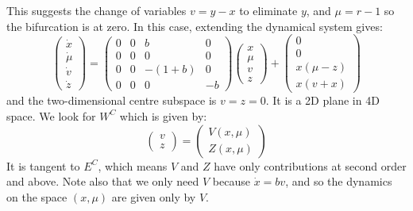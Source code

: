 \documentclass[../Main.tex]{subfiles}
\begin{document}
\begin{example}
    This suggests the change of variables $v = y-x$ to eliminate $y$, and $\mu = r - 1$ so the bifurcation is at zero. In this case, extending the dynamical system gives:
    \begin{equation*}
        \begin{pmatrix}\dot x \\ \dot \mu \\ \dot v \\ \dot z\end{pmatrix} =
        \begin{pmatrix}
            0 & 0 & b & 0 \\
            0 & 0 & 0 & 0 \\
            0 & 0 & -(1+b) & 0 \\
            0 & 0 & 0 & -b
        \end{pmatrix}
        \begin{pmatrix}x \\ \mu \\ v \\ z\end{pmatrix} + 
        \begin{pmatrix}0 \\ 0 \\ x(\mu - z) \\ x(v+x)\end{pmatrix}
    \end{equation*}
    and the two-dimensional centre subspace is $v = z = 0$. It is a 2D plane in 4D space. We look for $W^C$ which is given by:
    \begin{equation*}
        \begin{pmatrix}v \\ z\end{pmatrix} = \begin{pmatrix}V(x, \mu) \\ Z(x, \mu)\end{pmatrix}
    \end{equation*}
    It is tangent to $E^C$, which means $V$ and $Z$ have only contributions at second order and above. Note also that we only need $V$ because $\dot{x} = bv$, and so the dynamics on the space $(x, \mu)$ are given only by $V$.


\end{example}
\end{document}
